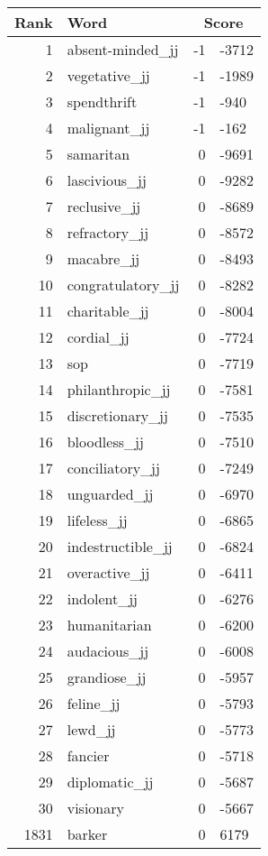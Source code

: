 \begin{longtable}[!htbp]{| rlr@{.}l |}
    \hline
    \textbf{Rank} & \textbf{Word} & \multicolumn{2}{c|}{\textbf{Score}} \\
    \hline
    \endhead
    1 & absent-minded\_jj & -1 & -3712 \\
    2 & vegetative\_jj & -1 & -1989 \\
    3 & spendthrift & -1 & -940 \\
    4 & malignant\_jj & -1 & -162 \\
    5 & samaritan & 0 & -9691 \\
    6 & lascivious\_jj & 0 & -9282 \\
    7 & reclusive\_jj & 0 & -8689 \\
    8 & refractory\_jj & 0 & -8572 \\
    9 & macabre\_jj & 0 & -8493 \\
    10 & congratulatory\_jj & 0 & -8282 \\
    11 & charitable\_jj & 0 & -8004 \\
    12 & cordial\_jj & 0 & -7724 \\
    13 & sop & 0 & -7719 \\
    14 & philanthropic\_jj & 0 & -7581 \\
    15 & discretionary\_jj & 0 & -7535 \\
    16 & bloodless\_jj & 0 & -7510 \\
    17 & conciliatory\_jj & 0 & -7249 \\
    18 & unguarded\_jj & 0 & -6970 \\
    19 & lifeless\_jj & 0 & -6865 \\
    20 & indestructible\_jj & 0 & -6824 \\
    21 & overactive\_jj & 0 & -6411 \\
    22 & indolent\_jj & 0 & -6276 \\
    23 & humanitarian & 0 & -6200 \\
    24 & audacious\_jj & 0 & -6008 \\
    25 & grandiose\_jj & 0 & -5957 \\
    26 & feline\_jj & 0 & -5793 \\
    27 & lewd\_jj & 0 & -5773 \\
    28 & fancier & 0 & -5718 \\
    29 & diplomatic\_jj & 0 & -5687 \\
    30 & visionary & 0 & -5667 \\
    1831 & barker & 0 & 6179 \\

\end{longtable}
